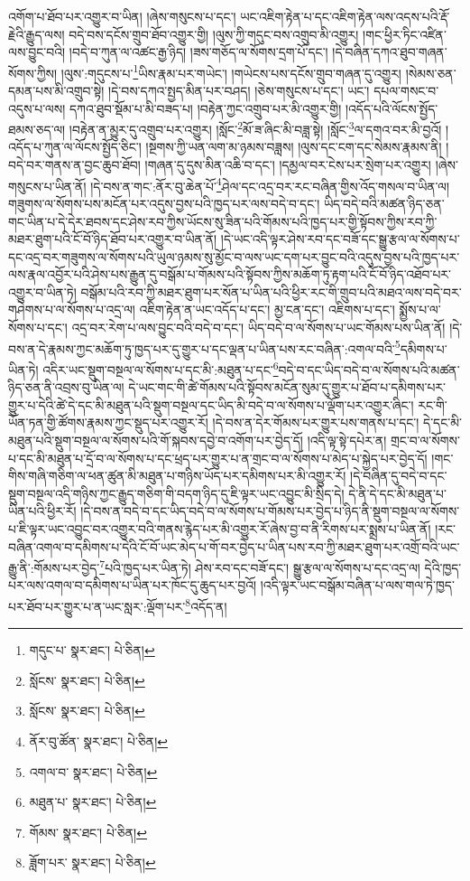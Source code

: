འགོག་པ་ཐོབ་པར་འགྱུར་བ་ཡིན། །ཞེས་གསུངས་པ་དང་། ཡང་འཇིག་རྟེན་པ་དང་འཇིག་རྟེན་ལས་འདས་པའི་རྡོ་རྗེའི་རྒྱུད་ལས། བདེ་བས་དངོས་གྲུབ་ཐོབ་འགྱུར་གྱི། །ལུས་ཀྱི་གདུང་བས་འགྲུབ་མི་འགྱུར། །གང་ཕྱིར་ཏིང་འཛིན་ལས་བྱུང་བའི། །བདེ་བ་ཀུན་ལ་འཚང་རྒྱ་ཉིད། །ཟས་གཅོད་ལ་སོགས་དྲག་པོ་དང་། །དེ་བཞིན་དཀའ་ཐུབ་གཞན་སོགས་ཀྱིས། །ལུས་:གདུངས་པ་\footnote{གདུང་པ་  སྣར་ཐང་།  པེ་ཅིན། }ཡིས་རྣམ་པར་གཡེང་། །གཡེངས་པས་དངོས་གྲུབ་གཞན་དུ་འགྱུར། །སེམས་ཅན་དམན་པས་མི་འགྲུབ་སྟེ། །དེ་བས་དཀའ་སྤྱད་མིན་པར་བཤད། །ཅེས་གསུངས་པ་དང་། ཡང་། དཔལ་གསང་བ་འདུས་པ་ལས། དཀའ་ཐུབ་སྡོམ་པ་མི་བཟད་པ། །བརྟེན་ཀྱང་འགྲུབ་པར་མི་འགྱུར་གྱི། །འདོད་པའི་ལོངས་སྤྱོད་ཐམས་ཅད་ལ། །བརྟེན་ན་མྱུར་དུ་འགྲུབ་པར་འགྱུར། །སློང་\footnote{སློངས་  སྣར་ཐང་།  པེ་ཅིན། }མོ་ཟ་ཞིང་མི་བཟླ་སྟེ། །སློང་\footnote{སློངས་  སྣར་ཐང་།  པེ་ཅིན། }ལ་དགའ་བར་མི་བྱའོ། །འདོད་པ་ཀུན་ལ་ལོངས་སྤྱོད་ཅིང་། །སྔགས་ཀྱི་ཡན་ལག་མ་ཉམས་བཟླས། །ལུས་དང་ངག་དང་སེམས་རྣམས་ནི། །བདེ་བར་གནས་ན་བྱང་ཆུབ་ཐོབ། །གཞན་དུ་དུས་མིན་འཆི་བ་དང་། །དམྱལ་བར་ངེས་པར་སྲེག་པར་འགྱུར། །ཞེས་གསུངས་པ་ཡིན་ནོ། །དེ་བས་ན་གང་:ནོར་བུ་ཆེན་པོ་\footnote{ནོར་བུ་ཚོན་  སྣར་ཐང་།  པེ་ཅིན། }ཤེལ་དང་འདྲ་བར་རང་བཞིན་གྱིས་འོད་གསལ་བ་ཡིན་ལ། གཟུགས་ལ་སོགས་པས་མངོན་པར་འདུས་བྱས་པའི་ཁྱད་པར་ལས་བདེ་བ་དང་། ཡིད་བདེ་བའི་མཚན་ཉིད་ཅན་གང་ཡིན་པ་དེ་དེར་ཐབས་དང་ཤེས་རབ་ཀྱིས་ཡོངས་སུ་ཟིན་པའི་གོམས་པའི་ཁྱད་པར་གྱི་སྟོབས་ཀྱིས་རབ་ཀྱི་མཐར་ཐུག་པའི་ངོ་བོ་ཉིད་ཐོབ་པར་འགྱུར་བ་ཡིན་ནོ། །དེ་ཡང་འདི་ལྟར་ཤེས་རབ་དང་བཟོ་དང་སྒྱུ་རྩལ་ལ་སོགས་པ་དང་འདྲ་བར་གཟུགས་ལ་སོགས་པའི་ཡུལ་ཉམས་སུ་མྱོང་བ་ལས་ཡང་དག་པར་བྱུང་བའི་འདུས་བྱས་པའི་ཁྱད་པར་ལས་རྣལ་འབྱོར་པའི་ཤེས་པས་རྒྱུན་དུ་བསྒོམ་པ་གོམས་པའི་སྟོབས་ཀྱིས་མཆོག་ཏུ་རྟག་པའི་ངོ་བོ་ཉིད་འཐོབ་པར་འགྱུར་བ་ཡིན་ཏེ། བསྒོམ་པའི་རབ་ཀྱི་མཐར་ཐུག་པར་སོན་པ་ཡིན་པའི་ཕྱིར་རང་གི་གྲུབ་པའི་མཐའ་ལས་བདེ་བར་གཤེགས་པ་ལ་སོགས་པ་འདྲ་ལ། འཇིག་རྟེན་ན་ཡང་འདོད་པ་དང་། མྱ་ངན་དང་། འཇིགས་པ་དང་། སྨྱོས་པ་ལ་སོགས་པ་དང་། འདྲ་བར་རེག་པ་ལས་བྱུང་བའི་བདེ་བ་དང་། ཡིད་བདེ་བ་ལ་སོགས་པ་ཡང་གོམས་པས་ཡིན་ནོ། །དེ་བས་ན་དེ་རྣམས་ཀྱང་མཆོག་ཏུ་ཁྱད་པར་དུ་གྱུར་པ་དང་ལྡན་པ་ཡིན་པས་རང་བཞིན་:འགལ་བའི་\footnote{འགལ་བ་  སྣར་ཐང་།  པེ་ཅིན། }དམིགས་པ་ཡིན་ཏེ། འདིར་ཡང་སྡུག་བསྔལ་ལ་སོགས་པ་དང་མི་:མཐུན་པ་དང་\footnote{མཐུན་པ་  སྣར་ཐང་།  པེ་ཅིན། }བདེ་བ་དང་ཡིད་བདེ་བ་ལ་སོགས་པའི་མཚན་ཉིད་ཅན་ནི་འབྲས་བུ་ཡིན་ལ། དེ་ཡང་གང་གི་ཚེ་གོམས་པའི་སྟོབས་མངོན་སུམ་དུ་གྱུར་པ་ཐོབ་པ་དམིགས་པར་གྱུར་པ་དེའི་ཚེ་དེ་དང་མི་མཐུན་པའི་སྡུག་བསྔལ་དང་ཡིད་མི་བདེ་བ་ལ་སོགས་པ་ལྡོག་པར་འགྱུར་ཞིང་། རང་གི་ཡོན་ཏན་གྱི་ཚོགས་རྣམས་ཀྱང་སྡུད་པར་འགྱུར་རོ། །དེ་བས་ན་དེར་གོམས་པར་གྱུར་པས་གནས་པ་དང་། དེ་དང་མི་མཐུན་པའི་སྡུག་བསྔལ་ལ་སོགས་པའི་གོ་སྐབས་དབྱེ་བ་འགོག་པར་བྱེད་དོ། །འདི་ལྟ་སྟེ་དཔེར་ན། གྲང་བ་ལ་སོགས་པ་དང་མི་མཐུན་པ་དྲོ་བ་ལ་སོགས་པ་དང་ཕྲད་པར་གྱུར་པ་ན་གྲང་བ་ལ་སོགས་པ་མེད་པ་སྐྱེད་པར་བྱེད་དོ། །གང་གིས་གཞི་གཅིག་ལ་ཕན་ཚུན་མི་མཐུན་པ་གཉིས་ཡོད་པར་དམིགས་པར་མི་འགྱུར་རོ། །དེ་བཞིན་དུ་བདེ་བ་དང་སྡུག་བསྔལ་འདི་གཉིས་ཀྱང་རྒྱུད་གཅིག་གི་བདག་ཉིད་དུ་ཇི་ལྟར་ཡང་འབྱུང་མི་སྲིད་དེ། དེ་ནི་དེ་དང་མི་མཐུན་པ་ཡིན་པའི་ཕྱིར་རོ། །དེ་བས་ན་བདེ་བ་དང་ཡིད་བདེ་བ་ལ་སོགས་པ་གོམས་པར་བྱེད་པ་ཉིད་ནི་སྡུག་བསྔལ་ལ་སོགས་པ་ཇི་ལྟར་ཡང་འབྱུང་བར་འགྱུར་བའི་གནས་རྙེད་པར་མི་འགྱུར་རོ་ཞེས་བྱ་བ་ནི་རིགས་པར་སྨྲས་པ་ཡིན་ནོ། །རང་བཞིན་འགལ་བ་དམིགས་པ་དེའི་ངོ་བོ་ཡང་མེད་པ་གོ་བར་བྱེད་པ་ཡིན་པས་རབ་ཀྱི་མཐར་ཐུག་པར་འགྲོ་བའི་ཡང་རྒྱུ་ནི་:གོམས་པར་བྱེད་\footnote{གོམས་  སྣར་ཐང་།  པེ་ཅིན། }པའི་ཁྱད་པར་ཡིན་ཏེ། ཤེས་རབ་དང་བཟོ་དང་། སྒྱུ་རྩལ་ལ་སོགས་པ་དང་འདྲ་ལ། དེའི་ཁྱད་པར་ལས་འགལ་བ་དམིགས་པ་ཡིན་པར་ཁོང་དུ་ཆུད་པར་བྱའོ། །འདི་ལྟར་ཡང་བསྒོམ་བཞིན་པ་ལས་གལ་ཏེ་ཁྱད་པར་ཐོབ་པར་གྱུར་པ་ན་ཡང་སླར་:ལྡོག་པར་\footnote{ཟློག་པར་  སྣར་ཐང་།  པེ་ཅིན། }འདོད་ན། 